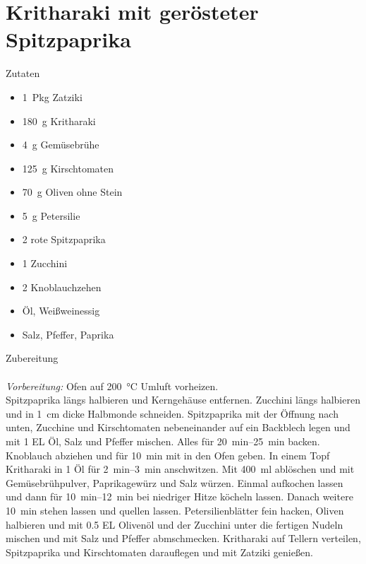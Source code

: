 \section*{Kritharaki mit gerösteter Spitzpaprika}
\ihead{}\ohead{}
\cfoot{}
{\Large Zutaten}
\begin{multicols}{2}
\begin{itemize}
    \item \SI{1}{Pkg} Zatziki
    \item \SI{180}{g} Kritharaki
    \item \SI{4}{g} Gemüsebrühe
    \item \SI{125}{g} Kirschtomaten
    \item \SI{70}{g} Oliven ohne Stein
    \item \SI{5}{g} Petersilie
    \item \num{2} rote Spitzpaprika
    \item \num{1} Zucchini
    \item \num{2} Knoblauchzehen
    \item Öl, Weißweinessig
    \item Salz, Pfeffer, Paprika
\end{itemize}
\end{multicols}
\noindent
{\Large Zubereitung}\\
\\
\textit{Vorbereitung:} Ofen auf \SI{200}{\celsius} Umluft vorheizen.\\
Spitzpaprika längs halbieren und Kerngehäuse entfernen.
Zucchini längs halbieren und in \SI{1}{cm} dicke Halbmonde schneiden.
Spitzpaprika mit der Öffnung nach unten, Zucchine und Kirschtomaten nebeneinander auf ein Backblech legen und mit \num{1} EL Öl, Salz und Pfeffer mischen.
Alles für \SIrange{20}{25}{min} backen.
Knoblauch abziehen und für \SI{10}{min} mit in den Ofen geben.
In einem Topf Kritharaki in \num{1} Öl für \SIrange{2}{3}{min} anschwitzen. Mit \SI{400}{ml} ablöschen und mit Gemüsebrühpulver, Paprikagewürz und Salz würzen. 
Einmal aufkochen lassen und dann für \SIrange{10}{12}{min} bei niedriger Hitze köcheln lassen.
Danach weitere \SI{10}{min} stehen lassen und quellen lassen. 
Petersilienblätter fein hacken, Oliven halbieren und mit \num{0,5} EL Olivenöl und der Zucchini unter die fertigen Nudeln mischen und mit Salz und Pfeffer abmschmecken. 
Kritharaki auf Tellern verteilen, Spitzpaprika und Kirschtomaten darauflegen und mit Zatziki genießen. 
